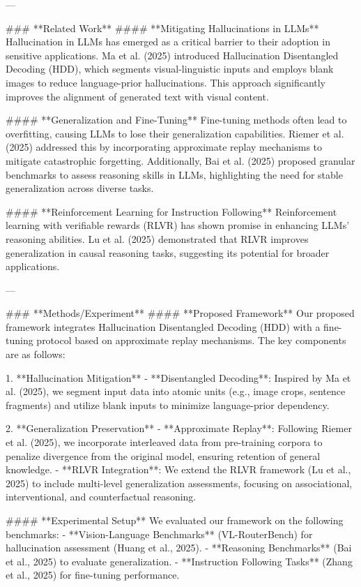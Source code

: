 ---

### **Related Work**  
#### **Mitigating Hallucinations in LLMs**  
Hallucination in LLMs has emerged as a critical barrier to their adoption in sensitive applications. Ma et al. (2025) introduced Hallucination Disentangled Decoding (HDD), which segments visual-linguistic inputs and employs blank images to reduce language-prior hallucinations. This approach significantly improves the alignment of generated text with visual content.

#### **Generalization and Fine-Tuning**  
Fine-tuning methods often lead to overfitting, causing LLMs to lose their generalization capabilities. Riemer et al. (2025) addressed this by incorporating approximate replay mechanisms to mitigate catastrophic forgetting. Additionally, Bai et al. (2025) proposed granular benchmarks to assess reasoning skills in LLMs, highlighting the need for stable generalization across diverse tasks.

#### **Reinforcement Learning for Instruction Following**  
Reinforcement learning with verifiable rewards (RLVR) has shown promise in enhancing LLMs' reasoning abilities. Lu et al. (2025) demonstrated that RLVR improves generalization in causal reasoning tasks, suggesting its potential for broader applications.

---

### **Methods/Experiment**  
#### **Proposed Framework**  
Our proposed framework integrates Hallucination Disentangled Decoding (HDD) with a fine-tuning protocol based on approximate replay mechanisms. The key components are as follows:

1. **Hallucination Mitigation**  
   - **Disentangled Decoding**: Inspired by Ma et al. (2025), we segment input data into atomic units (e.g., image crops, sentence fragments) and utilize blank inputs to minimize language-prior dependency.

2. **Generalization Preservation**  
   - **Approximate Replay**: Following Riemer et al. (2025), we incorporate interleaved data from pre-training corpora to penalize divergence from the original model, ensuring retention of general knowledge.
   - **RLVR Integration**: We extend the RLVR framework (Lu et al., 2025) to include multi-level generalization assessments, focusing on associational, interventional, and counterfactual reasoning.

#### **Experimental Setup**  
We evaluated our framework on the following benchmarks:
- **Vision-Language Benchmarks** (VL-RouterBench) for hallucination assessment (Huang et al., 2025).
- **Reasoning Benchmarks** (Bai et al., 2025) to evaluate generalization.
- **Instruction Following Tasks** (Zhang et al., 2025) for fine-tuning performance.

